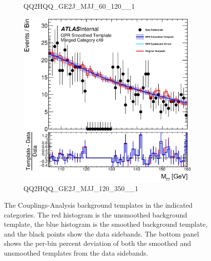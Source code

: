 \begin{figure}
\begin{center}
\begin{subfigure}[T]{0.49\linewidth}
	\caption{QQ2HQQ\_GE2J\_MJJ\_60\_120\_\_1}
\end{subfigure}
\begin{subfigure}[T]{0.49\linewidth}
	\centering
	\includegraphics[width=\linewidth]{figures/background/gpr/coupCatTemplates/GPR_Smoothed_Plot_hmgg_c49.eps}
	\caption{QQ2HQQ\_GE2J\_MJJ\_120\_350\_\_1}
\end{subfigure}
\caption{The Couplings-Analysis background templates in the indicated categories. The red histogram is the unsmoothed background template, the blue histogram is the smoothed background template, and the black points show the data sidebands. The bottom panel shows the per-bin percent deviation of both the smoothed and unsmoothed templates from the data sidebands. }
 \label{fig:gpr_coupcat_12}
 \end{center}
\end{figure}

